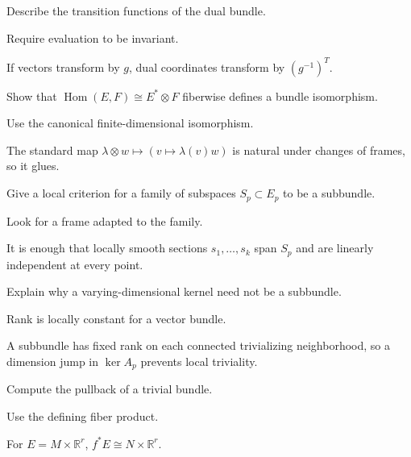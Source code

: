 \begin{exercise}\label{exr:vii07-15}
Describe the transition functions of the dual bundle.
\end{exercise}
\begin{hint}
Require evaluation to be invariant.
\end{hint}
\begin{solution}
If vectors transform by \(g\), dual coordinates transform by \((g^{-1})^T\).
\end{solution}

\begin{exercise}\label{exr:vii07-16}
Show that \(\operatorname{Hom}(E,F)\cong E^*\otimes F\) fiberwise defines a bundle isomorphism.
\end{exercise}
\begin{hint}
Use the canonical finite-dimensional isomorphism.
\end{hint}
\begin{solution}
The standard map \(\lambda\otimes w\mapsto(v\mapsto\lambda(v)w)\) is natural under changes of frames, so it glues.
\end{solution}

\begin{exercise}\label{exr:vii07-17}
Give a local criterion for a family of subspaces \(S_p\subset E_p\) to be a subbundle.
\end{exercise}
\begin{hint}
Look for a frame adapted to the family.
\end{hint}
\begin{solution}
It is enough that locally smooth sections \(s_1,\ldots,s_k\) span \(S_p\) and are linearly independent at every point.
\end{solution}

\begin{exercise}\label{exr:vii07-18}
Explain why a varying-dimensional kernel need not be a subbundle.
\end{exercise}
\begin{hint}
Rank is locally constant for a vector bundle.
\end{hint}
\begin{solution}
A subbundle has fixed rank on each connected trivializing neighborhood, so a dimension jump in \(\ker A_p\) prevents local triviality.
\end{solution}

\begin{exercise}\label{exr:vii07-19}
Compute the pullback of a trivial bundle.
\end{exercise}
\begin{hint}
Use the defining fiber product.
\end{hint}
\begin{solution}
For \(E=M\times\mathbb R^r\), \(f^*E\cong N\times\mathbb R^r\).
\end{solution}


